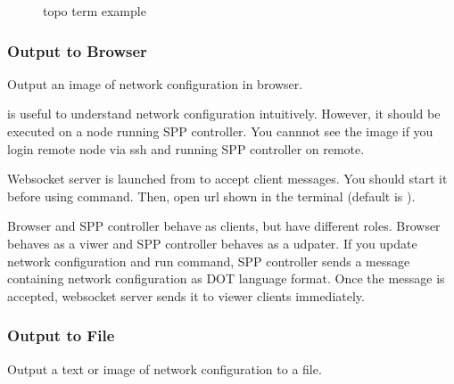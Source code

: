 \documentclass[a4paper,11pt,openany,oneside,english]{sphinxmanual}
\begin{document}
\begin{figure}[htbp]
\centering
\capstart

\noindent{}
\caption{topo term example}\label{\detokenize{commands/experimental:id1}}\label{\detokenize{commands/experimental:figure-topo-term-exp}}\end{figure}


\subsubsection{Output to Browser}
\label{\detokenize{commands/experimental:output-to-browser}}
Output an image of network configuration in browser.

\begin{sphinxVerbatim}[commandchars=\\\{\},formatcom=\footnotesize]
\end{sphinxVerbatim}

 is useful to understand network configuration intuitively.
However, it should be executed on a node running SPP controller.
You cannnot see the image if you login remote node via ssh and running
SPP controller on remote.

Websocket server is launched from 
to accept client messages.
You should start it before using  command.
Then, open url shown in the terminal (default is
).

Browser and SPP controller behave as clients, but have different roles.
Browser behaves as a viwer and SPP controller behaves as a udpater.
If you update network configuration and run  command,
SPP controller sends a message containing network configuration
as DOT language format.
Once the message is accepted, websocket server sends it to viewer clients
immediately.


\subsubsection{Output to File}
\label{\detokenize{commands/experimental:output-to-file}}
Output a text or image of network configuration to a file.

\begin{sphinxVerbatim}[commandchars=\\\{\},formatcom=\footnotesize]
\end{sphinxVerbatim}
\end{document}
